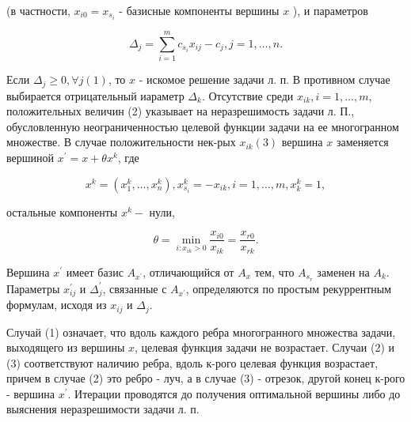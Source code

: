 \documentclass[10pt]{article}
\begin{document}
(в частности, $x_{i 0}=x_{s_{i}}$ - базисные компоненты вершины $x$ ), и параметров



\[

\Delta_{j}=\sum_{i=1}^{m} c_{s_{i}} x_{i j}-c_{j}, j=1, \ldots, n .

\]



Если $\Delta_{j} \geqslant 0, \forall j(1)$, то $x$ - искомое решение задачи л. п. В противном случае выбирается отрицательный иараметр $\Delta_{k}$. Отсутствие среди $x_{i k}, i=1, \ldots, m$, положительных величин (2) указывает на неразрешимость задачи л. П., обусловленную неограниченностью целевой функции задачи на ее многогранном множестве. В случае положительности нек-рых $x_{i k}(3)$ вершина $x$ заменяется вершиной $x^{\prime}=x+\theta x^{k}$, где



\[

x^{k}=\left(x_{1}^{k}, \ldots, x_{n}^{k}\right), x_{s_{i}}^{k}=-x_{i k}, i=1, \ldots, m, x_{k}^{k}=1,

\]



остальные компоненты $x^{k}-$ нули,



\[

\theta=\min _{i: x_{i k}>0} \frac{x_{i 0}}{x_{i k}}=\frac{x_{r 0}}{x_{r k}} .

\]



Вершина $x^{\prime}$ имеет базис $A_{x^{\prime}}$, отличающийся от $A_{x}$ тем, что $A_{s_{r}}$ заменен на $A_{k}$. Параметры $x_{i j}^{\prime}$ и $\Delta_{j}^{\prime}$, связанные с $A_{x^{\prime}}$, определяются по простым рекуррентным формулам, исходя из $x_{i j}$ и $\Delta_{j}$.



Случай (1) означает, что вдоль каждого ребра многогранного множества задачи, выходящего из вершины $x$, целевая функция задачи не возрастает. Случаи (2) и (3) соответствуют наличию ребра, вдоль к-рого целевая функция возрастает, причем в случае (2) это ребро - луч, а в случае (3) - отрезок, другой конец к-рого - вершина $x^{\prime}$. Итерации проводятся до получения оптимальной вершины либо до выяснения неразрешимости задачи л. п.
\end{document}
